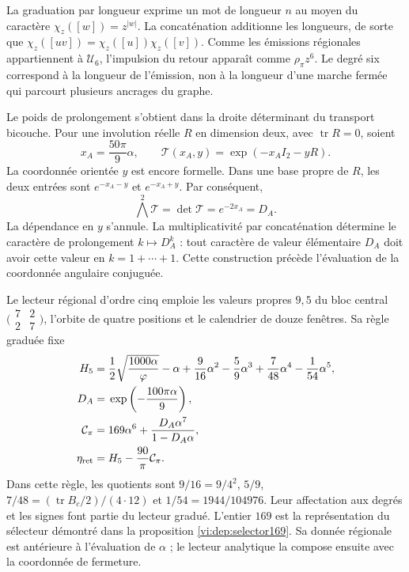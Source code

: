 La graduation par longueur exprime un mot de longueur \(n\)
au moyen du caractère \(\chi_z([w])=z^{|w|}\). La concaténation
additionne les longueurs, de sorte que
\(\chi_z([uv])=\chi_z([u])\chi_z([v])\). Comme les émissions
régionales appartiennent à \(\mathcal U_6\), l’impulsion du retour
apparaît comme \(\rho_\pi z^6\). Le degré six correspond à la
longueur de l’émission, non à la longueur d’une marche fermée qui
parcourt plusieurs ancrages du graphe.

Le poids de prolongement s’obtient dans la droite déterminant du
transport bicouche. Pour une involution réelle \(R\) en dimension deux,
avec \(\operatorname{tr}R=0\), soient
\[
 x_A=\frac{50\pi}{9}\alpha,\qquad
 \mathcal T(x_A,y)=\exp(-x_AI_2-yR).
\]
La coordonnée orientée \(y\) est encore formelle. Dans une base propre
de \(R\), les deux entrées sont \(e^{-x_A-y}\) et
\(e^{-x_A+y}\). Par conséquent,
\[
 \bigwedge^2\mathcal T=\det\mathcal T
 =e^{-2x_A}=D_A.
\]
La dépendance en \(y\) s’annule. La multiplicativité par
concaténation détermine le caractère de prolongement \(k\mapsto D_A^k\) :
tout caractère de valeur élémentaire \(D_A\) doit avoir cette valeur
en \(k=1+\cdots+1\). Cette construction précède l’évaluation
de la coordonnée angulaire conjuguée.

Le lecteur régional d’ordre cinq emploie les valeurs propres \(9,5\)
du bloc central \(\bigl(\begin{smallmatrix}7&2\\2&7\end{smallmatrix}\bigr)\),
l’orbite de quatre positions et le calendrier de douze fenêtres.
Sa règle graduée fixe
\begin{align}
 H_5={}&\frac12\sqrt{\frac{1000\alpha}{\varphi}}-\alpha
       +\frac9{16}\alpha^2-\frac59\alpha^3
       +\frac7{48}\alpha^4-\frac1{54}\alpha^5,\notag\\
 D_A={}&\exp\left(-\frac{100\pi\alpha}{9}\right),\notag\\
 \mathcal C_\pi={}&169\alpha^6+
                  \frac{D_A\alpha^7}{1-D_A\alpha},\notag\\
 \eta_{\rm ret}={}&H_5-\frac{90}{\pi}\mathcal C_\pi.
 \label{vi:dep:mantisas}
\end{align}
Dans cette règle, les quotients sont
\(9/16=9/4^2\), \(5/9\), \(7/48=(\operatorname{tr}B_c/2)/(4\cdot12)\)
et \(1/54=1944/104976\). Leur affectation aux degrés et les signes
font partie du lecteur gradué. L’entier \(169\) est la représentation
du sélecteur démontré dans la proposition \ref{vi:dep:selector169}.
Sa donnée régionale est antérieure à l’évaluation de \(\alpha\) ; le
lecteur analytique la compose ensuite avec la coordonnée de fermeture.

